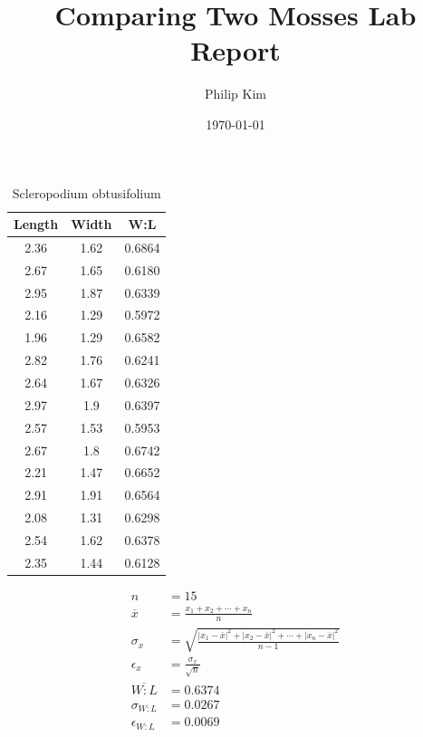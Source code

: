\documentclass{article}
\title{Comparing Two Mosses Lab Report}
\author{Philip Kim}
\date{\today}
\begin{document}
\maketitle
\begin{table}[h!]
  \begin{center}
    \caption{Scleropodium obtusifolium}
    \begin{tabular}{|c|c|c|}\hline
      Length & Width & W:L \\ \hline
      2.36 & 1.62 & 0.6864 \\ \hline
      2.67 & 1.65 & 0.6180 \\ \hline
      2.95 & 1.87 & 0.6339 \\ \hline
      2.16 & 1.29 & 0.5972 \\ \hline
      1.96 & 1.29 & 0.6582 \\ \hline
      2.82 & 1.76 & 0.6241 \\ \hline
      2.64 & 1.67 & 0.6326 \\ \hline
      2.97 & 1.9 & 0.6397 \\ \hline
      2.57 & 1.53 & 0.5953 \\ \hline
      2.67 & 1.8 & 0.6742 \\ \hline
      2.21 & 1.47 & 0.6652 \\ \hline
      2.91 & 1.91 & 0.6564 \\ \hline
      2.08 & 1.31 & 0.6298 \\ \hline
      2.54 & 1.62 & 0.6378 \\ \hline
      2.35 & 1.44 & 0.6128 \\ \hline
    \end{tabular}
  \end{center}
  \begin{center}
    \begin{equation}
      \begin{split}
        n &= 15 \\
        \overline{x} &= \frac{x_1 + x_2 + \cdots + x_n}{n} \\
        \sigma_{x} &= \sqrt{\frac{{|x_1 - \overline{x}|}^2 + {|x_2 - \overline{x}|}^2 + \cdots + {|x_n - \overline{x}|}^2}{n-1}} \\
        \epsilon_{x} &= \frac{\sigma_{x}}{\sqrt{n}} \\
        \overline{W:L} &= 0.6374 \\
        \sigma_{W:L} &= 0.0267 \\
        \epsilon_{W:L} &= 0.0069 \\
      \end{split}
    \end{equation}
  \end{center}
\end{table}
\end{document}
